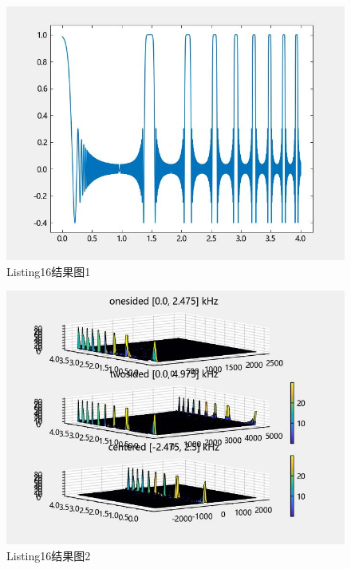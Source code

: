\documentclass{article}
\begin{document}
	\begin{figure}[htbp]
		\centering
		\includegraphics{hw5(16)-1.jpeg}
		\caption{Listing16结果图1}
		\label{fig16-1}
	\end{figure}
	\begin{figure}[htbp]
		\centering
		\includegraphics{hw5(16)-2.jpeg}
		\caption{Listing16结果图2}
		\label{fig16-2}
	\end{figure}
\end{document}
